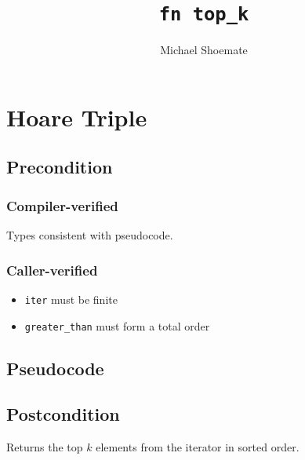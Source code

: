 \documentclass{article}
\title{\texttt{fn top\_k}}
\author{Michael Shoemate}
\begin{document}
  
\maketitle 
 
\section{Hoare Triple} 
\subsection*{Precondition} 
\subsubsection*{Compiler-verified}
Types consistent with pseudocode.

\subsubsection*{Caller-verified}

\begin{itemize}
    \item \texttt{iter} must be finite 
    \item \texttt{greater\_than} must form a total order
\end{itemize}

\subsection*{Pseudocode} 
\label{sec:python-pseudocode} 
 
 
\subsection*{Postcondition} 

\begin{theorem}
    Returns the top $k$ elements from the iterator in sorted order.
\end{theorem}
\end{document}
